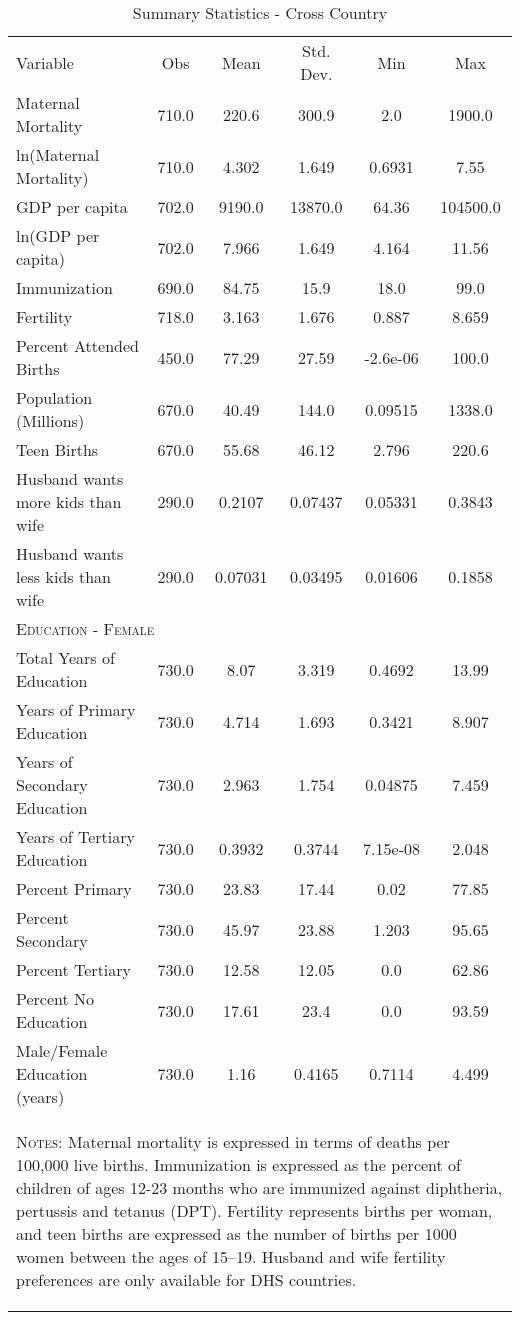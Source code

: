 \begin{table}[htpb!]\begin{center}
\caption{Summary Statistics - Cross Country}\label{MMRtab:sumstats}
\begin{tabular}{lccccc}
&&&&& \\ \toprule Variable&Obs&Mean&Std. Dev.&Min&Max\\\midrule 
Maternal Mortality&710.0&220.6&300.9&2.0&1900.0\\
ln(Maternal Mortality)&710.0&4.302&1.649&0.6931&7.55\\
GDP per capita&702.0&9190.0&13870.0&64.36&104500.0\\
ln(GDP per capita)&702.0&7.966&1.649&4.164&11.56\\
Immunization&690.0&84.75&15.9&18.0&99.0\\
Fertility&718.0&3.163&1.676&0.887&8.659\\
Percent Attended Births&450.0&77.29&27.59&-2.6e-06&100.0\\
Population (Millions) &670.0&40.49&144.0&0.09515&1338.0\\
Teen Births&670.0&55.68&46.12&2.796&220.6\\
Husband wants more kids than wife&290.0&0.2107&0.07437&0.05331&0.3843\\
Husband wants less kids than wife&290.0&0.07031&0.03495&0.01606&0.1858\\
\midrule\multicolumn{6}{l}{\textsc{Education - Female}} \\ 
 Total Years of Education&730.0&8.07&3.319&0.4692&13.99\\
Years of Primary Education&730.0&4.714&1.693&0.3421&8.907\\
Years of Secondary Education&730.0&2.963&1.754&0.04875&7.459\\
Years of Tertiary Education&730.0&0.3932&0.3744&7.15e-08&2.048\\
Percent Primary&730.0&23.83&17.44&0.02&77.85\\
Percent Secondary&730.0&45.97&23.88&1.203&95.65\\
Percent Tertiary&730.0&12.58&12.05&0.0&62.86\\
Percent No Education&730.0&17.61&23.4&0.0&93.59\\
Male/Female Education (years)&730.0&1.16&0.4165&0.7114&4.499\\
\midrule
\multicolumn{6}{p{13.4cm}}{\begin{footnotesize}\textsc{Notes:} Maternal mortality is expressed in terms of    deaths per 100,000 live births. Immunization is expressed as the percent of   children of ages 12-23 months who are immunized against diphtheria, pertussis  and tetanus (DPT). Fertility represents births per woman, and teen births are expressed as the number of births per 1000 women between the ages of 15--19. Husband and wife fertility preferences are only available for DHS countries.\end{footnotesize}} \\ \bottomrule \end{tabular}\end{center}\end{table}